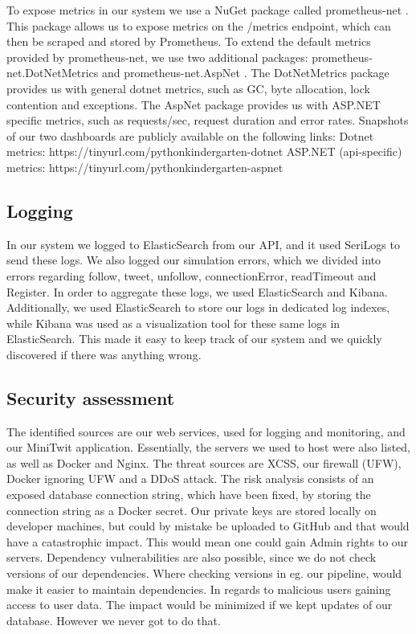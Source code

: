 To expose metrics in our system we use a NuGet package called prometheus-net \cite{prometheusnet}.
This package allows us to expose metrics on the /metrics endpoint, which can then be scraped and stored by Prometheus.
\newline
To extend the default metrics provided by prometheus-net, we use two additional packages: 
prometheus-net.DotNetMetrics \cite{prometheusdotnetmetrics} and prometheus-net.AspNet \cite{prometheusaspnet}.
\newline
The DotNetMetrics package provides us with general dotnet metrics, such as GC, byte allocation, lock contention and exceptions.
\newline
The AspNet package provides us with ASP.NET specific metrics, such as requests/sec, request duration and error rates.
\newline
\newline
Snapshots of our two dashboards are publicly available on the following links:
\newline
Dotnet metrics: https://tinyurl.com/pythonkindergarten-dotnet
\newline
ASP.NET (api-specific) metrics: https://tinyurl.com/pythonkindergarten-aspnet

\subsection{Logging}
In our system we logged to ElasticSearch from our API, and it used SeriLogs to send these logs. 
We also logged our simulation errors, which we divided into errors regarding follow, tweet, unfollow, connectionError, readTimeout and Register.
In order to aggregate these logs, we used ElasticSearch and Kibana. Additionally, we used ElasticSearch to store our logs in dedicated log indexes, while Kibana was used as a visualization tool for these same logs in ElasticSearch. This made it easy to keep track of our system and we quickly discovered if there was anything wrong. \newline

\subsection{Security assessment}
The identified sources are our web services, used for logging and monitoring, and our MiniTwit application.
Essentially, the servers we used to host were also listed, as well as Docker and Nginx.
The threat sources are XCSS, our firewall (UFW), Docker ignoring UFW and a DDoS attack.
The risk analysis consists of an exposed database connection string, which have been fixed, by storing the connection string as a Docker secret. Our private keys are stored locally on developer machines, but could by mistake be uploaded to GitHub and that would have a catastrophic impact. This would mean one could gain Admin rights to our servers.
Dependency vulnerabilities are also possible, since we do not check versions of our dependencies. Where checking versions in eg. our pipeline, would make it easier to maintain dependencies.
In regards to malicious users gaining access to user data. The impact would be minimized if we kept updates of our database. However we never got to do that.

